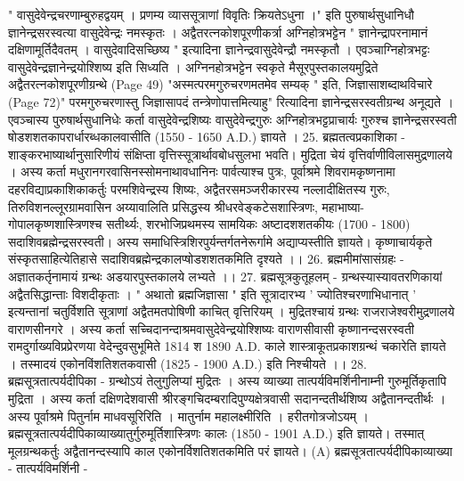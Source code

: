 " वासुदेवेन्द्रचरणाम्बुरुहद्वयम् । प्रणम्य व्याससूत्राणां विवृतिः क्रियतेऽधुना ।" इति पुरुषार्थसुधानिधौ ज्ञानेन्द्रसरस्वत्या वासुदेवेन्द्रः नमस्कृतः । अद्वैतरत्नकोशपूरणीकर्त्रा अग्निहोत्रभट्टेन " ज्ञानेन्द्रापरनामानं दक्षिणामूर्तिदैवतम् । वासुदेवादिसच्छिष्य " इत्यादिना ज्ञानेन्द्रवासुदेवेन्द्रौ	 नमस्कृतौ । एवञ्चाग्निहोत्रभट्टः वासुदेवेन्द्रज्ञानेन्द्रयोश्शिष्य इति सिध्यति । अग्निनहोत्रभट्टेन स्वकृते मैसूरपुस्तकालयमुद्रिते अद्वैतरत्नकोशपूरणीग्रन्थे (Page 49) "अस्मत्परमगुरुचरणमतमेव सम्यक् " इति, जिज्ञासाशब्दाथविचारे (Page 72)" परमगुरुचरणास्तु जिज्ञासापदं तन्त्रेणोपात्तमित्याहु" रित्यादिना ज्ञानेन्द्रसरस्वतीग्रन्थ अनूद्यते । एवञ्चास्य पुरुषार्थसुधानिधेः कर्ता वासुदेवेन्द्रशिष्यः वासुदेवेन्द्रगुरुः अग्निहोत्रभट्टप्राचार्यः गुरुश्च ज्ञानेन्द्रसरस्वती षोडशशतकापरार्धारब्धकालवासीति (1550 - 1650 A.D.) ज्ञायते । 
25. ब्रह्मतत्वप्रकाशिका - 
शाङ्करभाष्यार्थानुसारिणीयं संक्षिप्ता वृत्तिस्सूत्रार्थावबोधसुलभा भवति। मुद्रिता चेयं वृत्तिर्वाणीविलासमुद्रणालये । अस्य कर्ता मधुरानगरवासिनस्सोमनाथावधानिनः पार्वत्याश्च पुत्रः, पूर्वाश्रमे शिवरामकृष्णनामा दहरविद्याप्रकाशिकाकर्तुः परमशिवेन्द्रस्य शिष्यः, अद्वैतरसमञ्जरीकारस्य नल्लादीक्षितस्य गुरुः, तिरुविशनल्लूरग्रामवासिन अय्यावालिति प्रसिद्धस्य श्रीधरवेङ्कटेसशास्त्रिणः, महाभाष्या-गोपालकृष्णशास्त्रिणश्च सतीर्थ्यः, शरभोजिप्रथमस्य सामयिकः अष्टादशशतकीयः (1700 - 1800) सदाशिवब्रह्मेन्द्रसरस्वती। अस्य समाधिस्त्रिशिरपुर्यन्तर्गतनेरूर्गामे अद्याप्यस्तीति ज्ञायते। कृष्णाचार्यकृते संस्कृतसाहित्येतिहासे सदाशिवब्रह्मेन्द्रकालप्षोडशशतकमिति दृश्यते ।।
26. ब्रह्ममीमांसासंग्रहः - अज्ञातकर्तृनामायं ग्रन्थः अडयारपुस्तकालये लभ्यते ।। 
27. ब्रह्मसूत्रकुतूहलम् - 
ग्रन्थस्यास्यावतरणिकायां अद्वैतसिद्धान्ताः विशदीकृताः । " अथातो ब्रह्मजिज्ञासा "  इति सूत्रादारभ्य ' ज्योतिश्चरणाभिधानात् ' इत्यन्तानां चतुर्विशति सूत्राणां अद्वैतमतपोषिणी काचित् वृत्तिरियम् । मुद्रितश्चायं ग्रन्थः राजराजेश्वरीमुद्रणालये वाराणसीनगरे । अस्य कर्ता सच्चिदानन्दाश्रमवासुदेवेन्द्रयोश्शिष्यः वाराणसीवासी कृष्णानन्दसरस्वती रामदुर्गाख्यविप्रप्रेरणया वेदेन्दुवसुभूमिते 1814  श 1890 A.D. काले शास्त्राकूतप्रकाशग्रन्थं चकारेति ज्ञायते । तस्मादयं एकोनविंशतिशतकवासी (1825 - 1900 A.D.) इति निश्चीयते ।।
28. ब्रह्मसूत्रतात्पर्यदीपिका -
ग्रन्थोऽयं तेलुगुलिप्यां मुद्रितः । अस्य व्याख्या तात्पर्यविमर्शिनीनाम्नी गुरुमूर्तिकृतापि मुद्रिता । अस्य कर्ता दक्षिणदेशवासी श्रीरङ्गचिदम्बरादिपुण्यक्षेत्रवासी सदानन्दतीर्थशिष्य अद्वैतानन्दतीर्थः । अस्य पूर्वाश्रमे पितुर्नाम माधवसूरिरिति । मातुर्नाम महालक्ष्मीरिति । हरीतगोत्रजोऽयम् । ब्रह्मसूत्रतात्पर्यदीपिकाव्याख्यातुर्गुरुमूर्तिशास्त्रिणः कालः (1850 - 1901 A.D.) इति ज्ञायते। तस्मात् मूलग्रन्थकर्तुः अद्वैतानन्दस्यापि काल एकोनर्विशतिशतकमिति परं ज्ञायते। 
(A) ब्रह्मसूत्रतात्पर्यदीपिकाव्याख्या - तात्पर्यविमर्शिनी -

